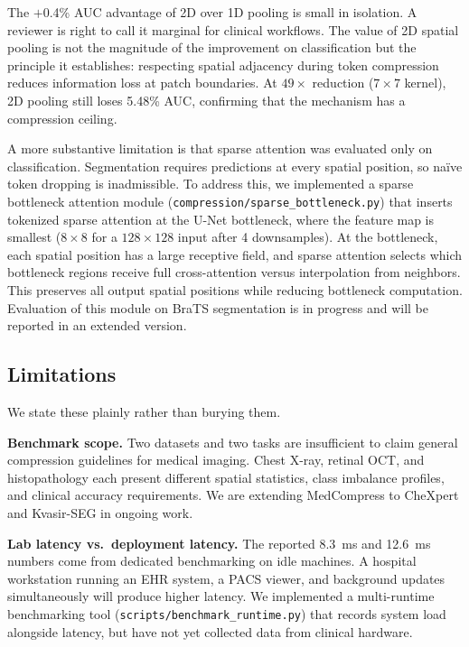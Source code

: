 \documentclass[10pt,twocolumn]{article}
\begin{document}
The $+$0.4\% AUC advantage of 2D over 1D pooling is small in isolation. A reviewer is right to call it marginal for clinical workflows. The value of 2D spatial pooling is not the magnitude of the improvement on classification but the principle it establishes: respecting spatial adjacency during token compression reduces information loss at patch boundaries. At $49{\times}$ reduction ($7{\times}7$ kernel), 2D pooling still loses 5.48\% AUC, confirming that the mechanism has a compression ceiling.

A more substantive limitation is that sparse attention was evaluated only on classification. Segmentation requires predictions at every spatial position, so na\"ive token dropping is inadmissible. To address this, we implemented a sparse bottleneck attention module (\texttt{compression/sparse\_bottleneck.py}) that inserts tokenized sparse attention at the U-Net bottleneck, where the feature map is smallest ($8{\times}8$ for a $128{\times}128$ input after 4 downsamples). At the bottleneck, each spatial position has a large receptive field, and sparse attention selects which bottleneck regions receive full cross-attention versus interpolation from neighbors. This preserves all output spatial positions while reducing bottleneck computation. Evaluation of this module on BraTS segmentation is in progress and will be reported in an extended version.

\subsection{Limitations}

We state these plainly rather than burying them.

\textbf{Benchmark scope.} Two datasets and two tasks are insufficient to claim general compression guidelines for medical imaging. Chest X-ray, retinal OCT, and histopathology each present different spatial statistics, class imbalance profiles, and clinical accuracy requirements. We are extending MedCompress to CheXpert and Kvasir-SEG in ongoing work.

\textbf{Lab latency vs.\ deployment latency.} The reported 8.3~ms and 12.6~ms numbers come from dedicated benchmarking on idle machines. A hospital workstation running an EHR system, a PACS viewer, and background updates simultaneously will produce higher latency. We implemented a multi-runtime benchmarking tool (\texttt{scripts/benchmark\_runtime.py}) that records system load alongside latency, but have not yet collected data from clinical hardware.
\end{document}
